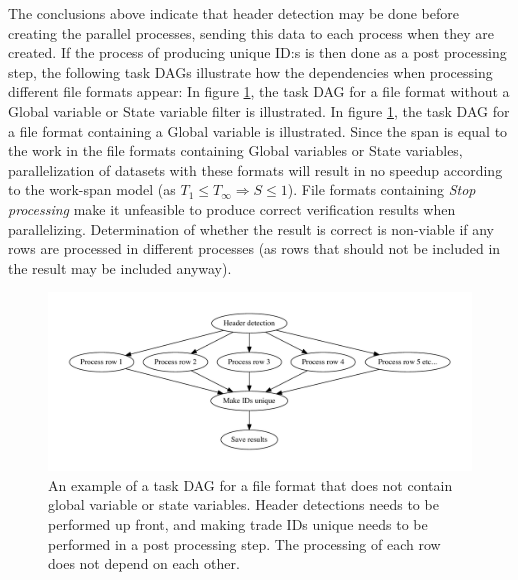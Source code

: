 The conclusions above indicate that header detection may be done before creating the parallel processes, sending this data to each process when they are created.
If the process of producing unique ID:s is then done as a post processing step, the following task DAGs illustrate how the dependencies when processing different
file formats appear: In figure \ref{fig:embarrassing_dag}, the task DAG for a file format without a Global variable or State variable filter is illustrated.
In figure \ref{fig:embarrassing_dag}, the task DAG for a file format containing a Global variable is illustrated. Since the span is equal to the work
in the file formats containing Global variables or State variables, parallelization of datasets with these formats will result in no speedup according to the %
work-span model (as $T_1 \leq T_\infty \Rightarrow S \leq 1$). File formats containing \textit{Stop processing} make it unfeasible to produce correct verification results
when parallelizing. Determination of whether the result is correct is non-viable if any rows are processed in different processes (as rows that should not be included in the result may be included anyway).

\begin{figure}[ht]
  \centering
  \includegraphics[width=120mm]{figures/embarrassing_file_format.pdf}
  \caption[Task DAG for a file format that does not contain global or state variables.]{An example of a task DAG for a file format that does not contain global variable or state variables. Header detections needs
  to be performed up front, and making trade IDs unique needs to be performed in a post processing step. The processing of each row does not depend on each other.}
  \label{fig:embarrassing_dag}
\end{figure}

